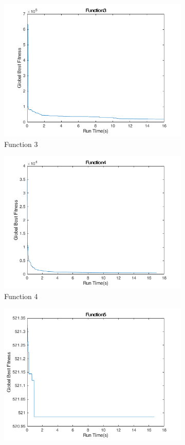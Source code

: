 \begin{figure}
\begin{subfigure}[b]{0.4\textwidth}
    \includegraphics[width=\textwidth]{img/cecrt/f3}
    \caption{Function 3}
  \end{subfigure}
  \begin{subfigure}[b]{0.4\textwidth}
    \includegraphics[width=\textwidth]{img/cecrt/f4}
    \caption{Function 4}
  \end{subfigure}
  \begin{subfigure}[b]{0.4\textwidth}
    \includegraphics[width=\textwidth]{img/cecrt/f5}

\end{subfigure}
\end{figure}
